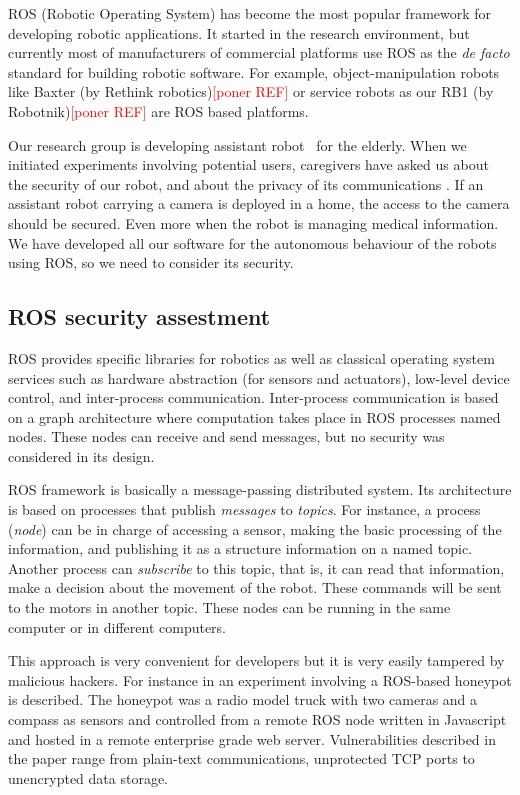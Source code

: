 \documentclass[journal,twoside]{JoPhA}
\begin{document}
ROS (Robotic Operating System) \cite{ROS09} has become the most popular framework for developing robotic applications. It started in the research environment, but currently most of manufacturers of commercial platforms use ROS as the {\em de facto} standard for building robotic software. For example, object-manipulation robots like Baxter (by Rethink robotics){\textcolor{red}{[poner REF]}} or service robots as our RB1 (by Robotnik){\textcolor{red}{[poner REF]}} are ROS based platforms.

Our research group is developing assistant robot~\cite{Martin2014} for the elderly. When we initiated experiments involving potential users, caregivers have asked us about the security of our robot, and about the privacy of its communications \cite{Denning2009}. If an assistant robot carrying a camera is deployed in a home, the access to the camera should be secured. Even more when the robot is managing medical information. We have developed all our software for the autonomous behaviour of the robots using ROS, so we need to consider its security.


\subsection{ROS security assestment}

ROS provides specific libraries for robotics as well as classical operating system services such as hardware abstraction (for sensors and actuators), low-level device control, and inter-process communication. Inter-process communication is based on a graph architecture where computation takes place in ROS processes named nodes. These nodes can receive and send messages, but no security was considered in its design. 

ROS framework is basically a message-passing distributed system. Its architecture is based on processes that publish {\em messages} to {\em topics}. For instance, a process ({\em node}) can be in charge of accessing a sensor, making the basic processing of the information, and publishing it as a structure information on a named topic. Another process can {\em subscribe} to this topic, that is, it can read that information, make a decision about the movement of the robot. These commands will be sent to the motors in another topic. These nodes can be running in the same computer or in different computers. 

This approach is very convenient for developers but it is very easily tampered by malicious hackers. For instance in \cite{McClean2013} an experiment involving a ROS-based honeypot is described. The honeypot was a radio model truck with two cameras and a compass as sensors and controlled from a remote ROS node written in Javascript and hosted in a remote enterprise grade web server. Vulnerabilities described in the paper range from plain-text communications, unprotected TCP ports to unencrypted data storage.
\end{document}
